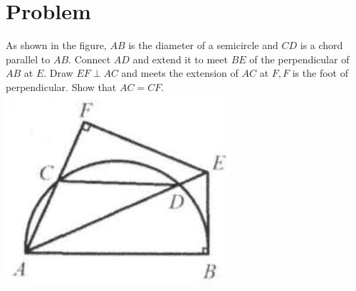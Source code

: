 \documentclass{article}
\begin{document}
\section*{Problem}
As shown in the figure, \(A B\) is the diameter of a semicircle and \(C D\) is a chord parallel to \(A B\). Connect \(A D\) and extend it to meet \(B E\) of the perpendicular of \(A B\) at \(E\). Draw \(E F \perp A C\) and meets the extension of \(A C\) at \(F, F\) is the foot of perpendicular. Show that \(A C=C F\).\\
\centering
\includegraphics[width=\textwidth]{images/206(1).jpg}
\end{document}
